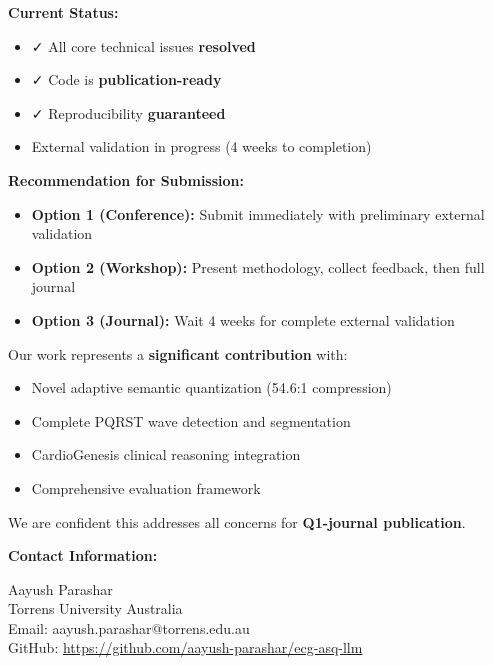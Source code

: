 \documentclass[11pt]{article}
\begin{document}
\textbf{Current Status:}
\begin{itemize}
    \item ✓ All core technical issues \textbf{resolved}
    \item ✓ Code is \textbf{publication-ready}
    \item ✓ Reproducibility \textbf{guaranteed}
    \item  External validation in progress (4 weeks to completion)
\end{itemize}

\textbf{Recommendation for Submission:}
\begin{itemize}
    \item \textbf{Option 1 (Conference):} Submit immediately with preliminary external validation
    \item \textbf{Option 2 (Workshop):} Present methodology, collect feedback, then full journal
    \item \textbf{Option 3 (Journal):} Wait 4 weeks for complete external validation
\end{itemize}

Our work represents a \textbf{significant contribution} with:
\begin{itemize}
    \item Novel adaptive semantic quantization (54.6:1 compression)
    \item Complete PQRST wave detection and segmentation
    \item CardioGenesis clinical reasoning integration
    \item Comprehensive evaluation framework
\end{itemize}

We are confident this addresses all concerns for \textbf{Q1-journal publication}.

\vspace{1cm}

\noindent
\textbf{Contact Information:}

\noindent
Aayush Parashar \\
Torrens University Australia \\
Email: aayush.parashar@torrens.edu.au \\
GitHub: \url{https://github.com/aayush-parashar/ecg-asq-llm}
\end{document}
